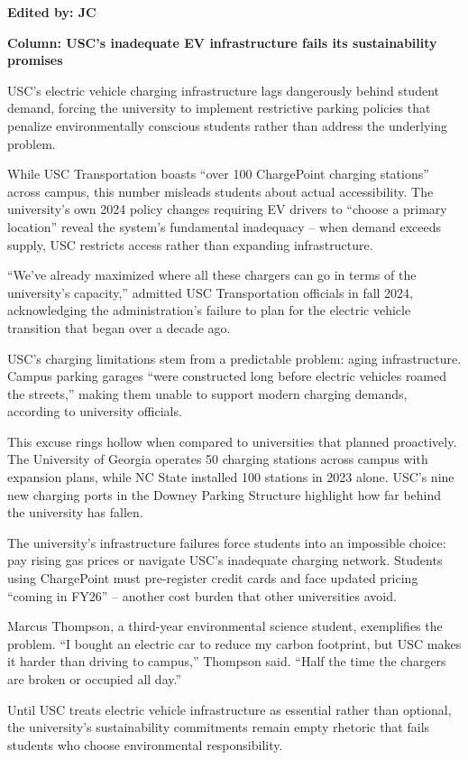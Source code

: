 \documentclass[12pt]{article}
\begin{document}
\newpage
\begin{newversion}
\textbf{Edited by: JC}

\textbf{Column: USC's inadequate EV infrastructure fails its sustainability promises}

USC's electric vehicle charging infrastructure lags dangerously behind student demand, forcing the university to implement restrictive parking policies that penalize environmentally conscious students rather than address the underlying problem.

While USC Transportation boasts ``over 100 ChargePoint charging stations'' across campus, this number misleads students about actual accessibility. The university's own 2024 policy changes requiring EV drivers to ``choose a primary location'' reveal the system's fundamental inadequacy – when demand exceeds supply, USC restricts access rather than expanding infrastructure.

``We've already maximized where all these chargers can go in terms of the university's capacity,'' admitted USC Transportation officials in fall 2024, acknowledging the administration's failure to plan for the electric vehicle transition that began over a decade ago.

USC's charging limitations stem from a predictable problem: aging infrastructure. Campus parking garages ``were constructed long before electric vehicles roamed the streets,'' making them unable to support modern charging demands, according to university officials.

This excuse rings hollow when compared to universities that planned proactively. The University of Georgia operates 50 charging stations across campus with expansion plans, while NC State installed 100 stations in 2023 alone. USC's nine new charging ports in the Downey Parking Structure highlight how far behind the university has fallen.

The university's infrastructure failures force students into an impossible choice: pay rising gas prices or navigate USC's inadequate charging network. Students using ChargePoint must pre-register credit cards and face updated pricing ``coming in FY26'' – another cost burden that other universities avoid.

Marcus Thompson, a third-year environmental science student, exemplifies the problem. ``I bought an electric car to reduce my carbon footprint, but USC makes it harder than driving to campus,'' Thompson said. ``Half the time the chargers are broken or occupied all day.''

Until USC treats electric vehicle infrastructure as essential rather than optional, the university's sustainability commitments remain empty rhetoric that fails students who choose environmental responsibility.
\end{newversion}
\end{document}
